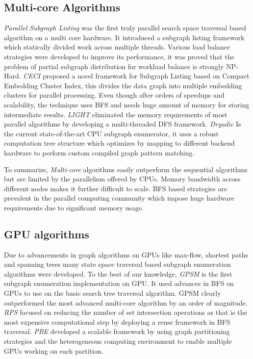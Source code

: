 \subsection{Multi-core Algorithms} \label{sec:lit-par}
\textit{Parallel Subgraph Listing} \cite{psgl} was the first truly parallel search space traversal based algorithm on a multi core hardware. It introduced a subgraph listing framework which statically divided work across multiple threads.
Various load balance strategies were developed to improve its performance, it was proved that the problem of partial subgraph distribution for workload balance is strongly NP-Hard.
\textit{CECI} \cite{CECI} proposed a novel framework for Subgraph Listing based on Compact Embedding Cluster Index, this divides the data graph into multiple embedding clusters for parallel processing.
Even though after orders of speedups and scalability, the technique uses BFS and needs huge amount of memory for storing intermediate results.
\textit{LIGHT} \cite{LIGHT} eliminated the memory requirements of most parallel algorithms by developing a multi-threaded DFS framework.
\textit{Dryadic} \cite{Dryadic} Is the current state-of-the-art CPU subgraph enumerator, it uses a robust computation tree structure which optimizes by mapping to different backend hardware to perform custom compiled graph pattern matching.

To summarize, \textit{Multi-core} algorithms easily outperform the sequential algorithms but are limited by the parallelism offered by CPUs.
Memory bandwidth across different nodes makes it further difficult to scale.
BFS based strategies are prevalent in the parallel computing community which impose huge hardware requirements due to significant memory usage.

\subsection{GPU algorithms} \label{sec:lit-gpu}
Due to advancements in graph algorithms on GPUs like max-flow, shortest paths and spanning trees many state space traversal based subgraph enumeration algorithms were developed.
To the best of our knowledge, \textit{GPSM} \cite{GPSM} is the first subgraph enumeration implementation on GPU.
It used advances in BFS on GPUs to use on the basic search tree traversal algorithm. GPSM clearly outperformed the most advanced multi-core algorithm by an order of magnitude.
\textit{RPS} \cite{RPS-paper} focused on reducing the number of set intersection operations as that is the most expensive computational step by deploying a reuse framework in BFS traversal.
\textit{PBE} \cite{PBE-paper} developed a scalable framework by using graph partitioning strategies and the heterogeneous computing environment to enable multiple GPUs working on each partition.

